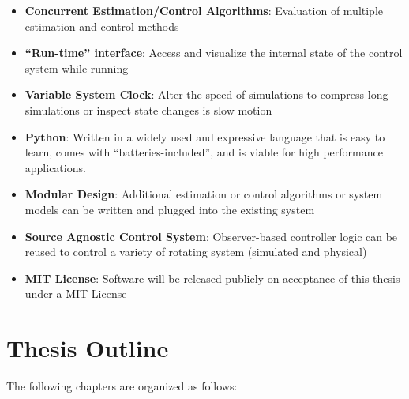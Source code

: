 \begin{itemize}
  \item \textbf{Concurrent Estimation/Control Algorithms}: Evaluation of multiple estimation and control methods
  \item \textbf{``Run-time'' interface}: Access and visualize the internal state of the control system while running
  \item \textbf{Variable System Clock}: Alter the speed of simulations to compress long simulations or inspect state changes is slow motion
  \item \textbf{Python}: Written in a widely used and expressive language that is easy to learn, comes with ``batteries-included'', and is viable for high performance applications.
  \item \textbf{Modular Design}: Additional estimation or control algorithms or system models can be written and plugged into the existing system
  \item \textbf{Source Agnostic Control System}: Observer-based controller logic can be reused to control a variety of rotating system (simulated and physical)
  \item \textbf{MIT License}: Software will be released publicly on acceptance of this thesis under a MIT License
\end{itemize}

\section{Thesis Outline}
\label{sec:ThesisOutline}

The following chapters are organized as follows:


